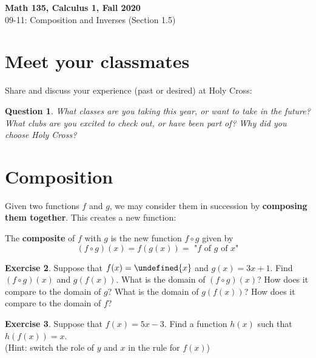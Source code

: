 \documentclass[11pt,reqno,final]{amsart}
\makeatletter
\let\sqrt=\undefined
\DeclareRobustCommand\sqrt{\@ifnextchar[\@sqrt{\mathpalette\@x@sqrt}}
\def\@x@sqrt#1#2{%
 \setbox\z@\hbox{$\m@th#1\sqrtsign{\mkern1mu #2}$}
 \mkern3mu\box\z@}
\numberwithin{equation}{section}
\numberwithin{figure}{section}
\newtheorem{question}{Question}
\theoremstyle{definition} %
\newtheorem{exercise}[question]{Exercise}
\makeatother
\begin{document}
\begin{center}
        \textbf{\Large Math 135, Calculus 1, Fall 2020}\\[10pt]
        {\large 09-11: Composition and Inverses (Section 1.5)}
\end{center}

\thispagestyle{empty}

\renewcommand{\thesection}{\Alph{section}}

\section{Meet your classmates}

Share and discuss your experience (past or desired) at Holy Cross:
\begin{question}
        What classes are you taking this year, or want to take in the future?
        What clubs are you excited to check out, or have been part of?
        Why did you choose Holy Cross?
\end{question}


\section{Composition}

Given two functions $f$ and $g$, we may consider them in succession by \textbf{composing them together}.
This creates a new function:
\begin{framed}
        The \textbf{composite} of $f$ with $g$ is the new function $f \circ g$ given by
        \[
                (f \circ g)(x) = f(g(x)) = \mbox{ "$f$ of $g$ of $x$"}
        \]
\end{framed}

\begin{exercise}
        Suppose that $f(x) = \sqrt{x}$ and $g(x) = 3x+1$.
        Find $(f \circ g)(x)$ and $g(f(x))$.
        \vfill
        \vfill
        What is the domain of $(f \circ g)(x)$? How does it compare to the domain of $g$?
        \vfill
        What is the domain of $g(f(x))$? How does it compare to the domain of $f$?
        \vfill
\end{exercise}

\begin{exercise}
        Suppose that $f(x) = 5x-3$.
        Find a function $h(x)$ such that $h(f(x)) = x$.\\
        (Hint: switch the role of $y$ and $x$ in the rule for $f(x)$)
        \vfill
\end{exercise}
\end{document}
